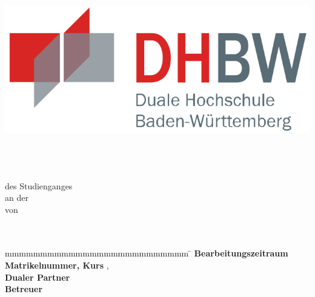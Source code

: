\documentclass[
	12pt,				%
	titlepage,			%
	a4paper,			%
	oneside,			%
]{article}
\begin{document}
\begin{titlepage}

\includegraphics[scale=0.15]{images/dhbw.png}\hfill
	
\vspace*{\fill}

\begin{center}
	\vspace*{12mm}	{\LARGE\textbf \titel }\\
        \vspace*{3mm}  {\Large\textbf \untertitel}\\
	\vspace*{9mm}	{\textbf \abschluss}\\
	\vspace*{9mm}	des Studienganges \studiengang\\
    \vspace*{3mm}	an der \dhbw\\
	\vspace*{9mm}	von\\
	\vspace*{3mm}	{\large\textbf \autor}\\
	\vspace*{9mm}	\datum\\
\end{center}

\vspace*{\fill}

\begin{tabbing}
	mmmmmmmmmmmmmmmmmmmmmmmmmm				\= \kill
	\textbf{Bearbeitungszeitraum}			\>  \bz \\
	\textbf{Matrikelnummer, Kurs}			\>  \matnr , \kurs \\
	\textbf{Dualer Partner}					\>  \firma \\
	\textbf{Betreuer}	                    \>  \betreuer \\
\end{tabbing}
\end{titlepage}
\end{document}
